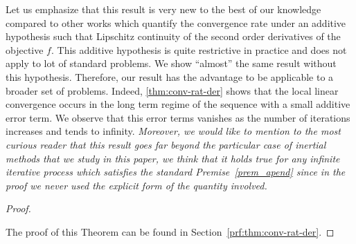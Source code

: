 \begin{remark}\label{rem:conv-rat-der}Let us emphasize  that this result is very new to the best of our knowledge compared  to other works which quantify the convergence rate under an additive hypothesis such that Lipschitz continuity of the second order derivatives of the  objective  $f$. This additive hypothesis is quite restrictive in practice and does not apply to  lot of standard problems. We show ``almost'' the same result without this hypothesis. Therefore, our result has the advantage to be applicable to a broader set of problems.  Indeed, \eqref{thm:conv-rat-der} shows that the local linear convergence occurs in the long term regime of the sequence with a small additive error term. We observe that this error terms vanishes as the number of iterations increases and tends to infinity. \textit{Moreover, we would like to mention to the most curious reader that this result goes far beyond the particular case of  inertial methods that we study in this paper, we think that  it holds true for any infinite iterative process which satisfies the standard Premise~\ref{prem_apend} since in the proof we never used the explicit form of the quantity involved.} 
\end{remark}


\begin{proof}$~$

The proof of this Theorem can be found in Section~\ref{prf:thm:conv-rat-der}.
\end{proof}


